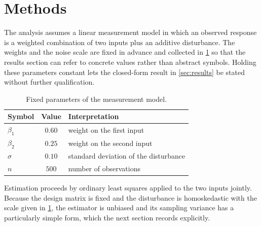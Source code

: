 \section{Methods}
\label{sec:methods}

The analysis assumes a linear measurement model in which an observed response is
a weighted combination of two inputs plus an additive disturbance. The weights
and the noise scale are fixed in advance and collected in \cref{tab:params} so
that the results section can refer to concrete values rather than abstract
symbols. Holding these parameters constant lets the closed-form result in
\cref{sec:results} be stated without further qualification.

\begin{table}[htbp]
\centering
\caption{Fixed parameters of the measurement model.}
\label{tab:params}
\begin{tabular}{lcl}
\toprule
Symbol & Value & Interpretation \\
\midrule
$\beta_1$    & $0.60$ & weight on the first input \\
$\beta_2$    & $0.25$ & weight on the second input \\
$\sigma$     & $0.10$ & standard deviation of the disturbance \\
$n$          & $500$  & number of observations \\
\bottomrule
\end{tabular}
\end{table}

Estimation proceeds by ordinary least squares applied to the two inputs jointly.
Because the design matrix is fixed and the disturbance is homoskedastic with the
scale given in \cref{tab:params}, the estimator is unbiased and its sampling
variance has a particularly simple form, which the next section records
explicitly.
